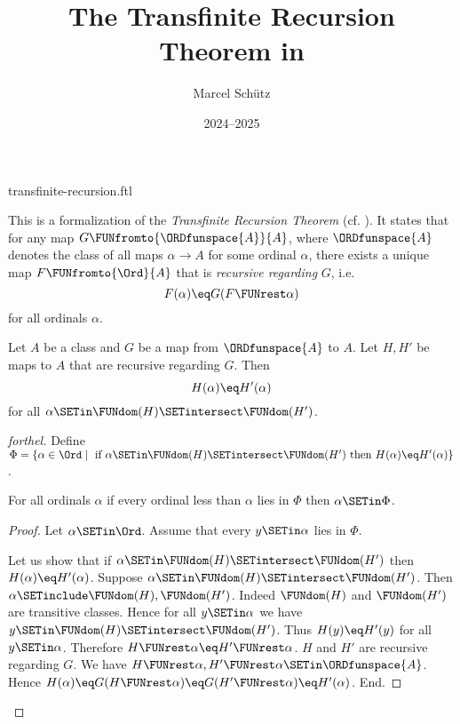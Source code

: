 \documentclass{stex}
\title{The Transfinite Recursion Theorem in \Naproche}
\author{Marcel Schütz}
\date{2024--2025}
\begin{document}
\begin{smodule}{transfinite-recursion.ftl}
\maketitle


\noindent This is a formalization of the \emph{Transfinite Recursion Theorem}
(cf. \cite{Koepke2018}).
It states that for any map $G \FUNfromto{\ORDfunspace{A}}{A}$, where
$\ORDfunspace{A}$ denotes the class of all maps $\alpha \to A$ for some
ordinal $\alpha$, there exists a unique map $F \FUNfromto{\Ord}{A}$ that is
\emph{recursive regarding} $G$, i.e. \[F(\alpha) \eq G(F \FUNrest \alpha)\] for
all ordinals $\alpha$.

\begin{lemma}[forthel,title=Coincidence Lemma,id=transfinite_recursion_coincidence]
  Let $A$ be a class and $G$ be a map from $\ORDfunspace{A}$ to $A$.
  Let $H, H'$ be maps to $A$ that are recursive regarding $G$.
  Then \[ H(\alpha) \eq H'(\alpha) \] for all $\alpha \SETin \FUNdom(H) \SETintersect \FUNdom(H')$.
\end{lemma}
\begin{proof}[forthel]
  Define $\Phi = \{ \alpha \in \Ord \mid\text{ if }
  \alpha \SETin \FUNdom(H) \SETintersect \FUNdom(H')\text{ then }H(\alpha) \eq H'(\alpha) \}$.

  For all ordinals $\alpha$ if every ordinal less than $\alpha$ lies in $\Phi$ then $\alpha \SETin \Phi$.
  \begin{proof}
    Let $\alpha \SETin \Ord$.
    Assume that every $y \SETin \alpha$ lies in $\Phi$.

    Let us show that if $\alpha \SETin \FUNdom(H) \SETintersect \FUNdom(H')$ then
    $H(\alpha) \eq H'(\alpha)$.
      Suppose $\alpha \SETin \FUNdom(H) \SETintersect \FUNdom(H')$.
      Then $\alpha \SETinclude \FUNdom(H), \FUNdom(H')$.
      Indeed $\FUNdom(H)$ and $\FUNdom(H')$ are transitive classes.
      Hence for all $y \SETin \alpha$ we have $y \SETin \FUNdom(H) \SETintersect \FUNdom(H')$.
      Thus $H(y) \eq H'(y)$ for all $y \SETin \alpha$.
      Therefore $H \FUNrest \alpha \eq H' \FUNrest \alpha$.
      $H$ and $H'$ are recursive regarding $G$.
      We have $H \FUNrest \alpha, H' \FUNrest \alpha \SETin \ORDfunspace{A}$.
      Hence $H(\alpha)
        \eq G(H \FUNrest \alpha)
        \eq G(H' \FUNrest \alpha)
        \eq H'(\alpha)$.
    End.


\end{proof}
\end{proof}
\end{smodule}
\end{document}
